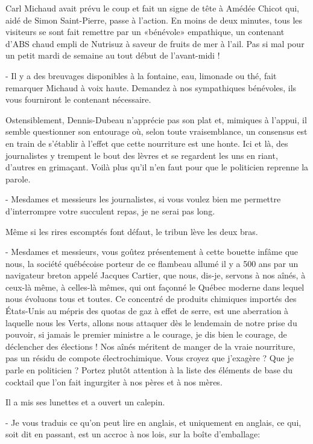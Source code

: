 Carl Michaud avait prévu le coup et fait un signe de tête à Amédée Chicot qui, aidé de Simon Saint-Pierre, passe à l’action. En moins de deux minutes, tous les visiteurs se sont fait remettre par un «bénévole» empathique, un contenant d’ABS chaud empli de Nutrisuz à saveur de fruits de mer à l’ail. Pas si mal pour un petit mardi de semaine au tout début de l’avant-midi !

- Il y a des breuvages disponibles à la fontaine, eau, limonade ou thé, fait remarquer Michaud à voix haute. Demandez à nos sympathiques bénévoles, ils vous fourniront le contenant nécessaire.

Ostensiblement, Dennis-Dubeau n’apprécie pas son plat et, mimiques à l’appui, il semble questionner son entourage où, selon toute vraisemblance, un consensus est en train de s’établir à l’effet que cette nourriture est une honte. Ici et là, des journalistes y trempent le bout des lèvres et se regardent les uns en riant, d’autres en grimaçant. Voilà plus qu’il n’en faut pour que le politicien reprenne la parole.

- Mesdames et messieurs les journalistes, si vous voulez bien me permettre d’interrompre votre succulent repas, je ne serai pas long.

Même si les rires escomptés font défaut, le tribun lève les deux bras.

- Mesdames et messieurs, vous goûtez présentement à cette bouette infâme que nous, la société québécoise porteur de ce flambeau allumé il y a 500 ans par un navigateur breton appelé Jacques Cartier, que nous, dis-je, servons à nos aînés, à ceux-là même, à celles-là mêmes, qui ont façonné le Québec moderne dans lequel nous évoluons tous et toutes. Ce concentré de produits chimiques importés des États-Unis au mépris des quotas de gaz à effet de serre, est une aberration à laquelle nous les Verts, allons nous attaquer dès le lendemain de notre prise du pouvoir, si jamais le premier ministre a le courage, je dis bien le courage, de déclencher des élections ! Nos aînés méritent de manger de la vraie nourriture, pas un résidu de compote électrochimique. Vous croyez que j’exagère ? Que je parle en politicien ? Portez plutôt attention à la liste des éléments de base du cocktail que l’on fait ingurgiter à nos pères et à nos mères.

Il a mis ses lunettes et a ouvert un calepin.

- Je vous traduis ce qu’on peut lire en anglais, et uniquement en anglais, ce qui, soit dit en passant, est un accroc à nos lois, sur la boîte d’emballage:

